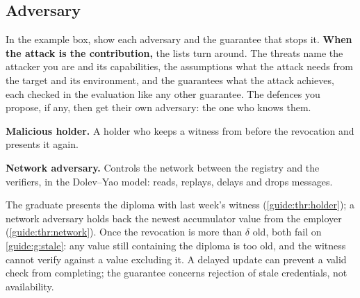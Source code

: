 \subsection[Adversary]{Adversary\skimmark}\label{guide:chapters:adversary}
In the example box, show each adversary and the guarantee that stops it.
\textbf{When the attack is the contribution,} the lists turn around. The threats name the attacker you are and its capabilities, the assumptions what the attack needs from the target and its environment, and the guarantees what the attack achieves, each checked in the evaluation like any other guarantee. The defences you propose, if any, then get their own adversary: the one who knows them.
\begin{threats}
  \item\label{guide:thr:holder} \textbf{Malicious holder.} A holder who keeps a witness from before the revocation and presents it again.
  \item\label{guide:thr:network} \textbf{Network adversary.} Controls the network between the registry and the verifiers, in the Dolev--Yao model: reads, replays, delays and drops messages.
\end{threats}
\begin{runningexample}
The graduate presents the diploma with last week's witness (\cref{guide:thr:holder}); a network adversary holds back the newest accumulator value from the employer (\cref{guide:thr:network}). Once the revocation is more than $\delta$ old, both fail on \cref{guide:g:stale}: any value still containing the diploma is too old, and the witness cannot verify against a value excluding it. A delayed update can prevent a valid check from completing; the guarantee concerns rejection of stale credentials, not availability.
\end{runningexample}

